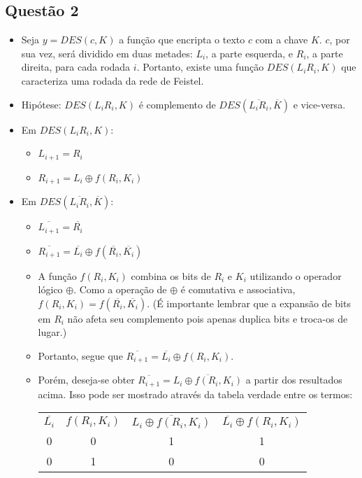 \documentclass{article}
\begin{document}
\subsection*{Questão 2}
\begin{itemize}
    \item Seja $y = DES(c, K)$ a função que encripta o texto $c$ com a chave $K$. $c$, por sua vez, será dividido em duas metades: $L_i$, a parte esquerda, e $R_i$, a parte direita, para cada rodada $i$. Portanto, existe uma função $DES(L_iR_i, K)$ que caracteriza uma rodada da rede de Feistel.
    \item Hipótese: $DES(L_iR_i, K)$ é complemento de $DES(\overline{L_iR_i}, \overline{K})$ e vice-versa.
    \item Em $DES(L_iR_i, K)$:
    \begin{itemize}
        \item $L_{i+1} = R_i$
        \item $R_{i+1} = L_i \oplus f(R_i,K_i)$
    \end{itemize}    
    \item Em $DES(\overline{L_iR_i}, \overline{K})$:
    \begin{itemize}
        \item $\overline{L_{i+1}} = \overline{R_i}$
        \item $\overline{R_{i+1}} = \overline{L_i} \oplus f(\overline{R_i},\overline{K_i})$
        \item A função ${f(R_i,K_i)}$ combina os bits de $R_i$ e $K_i$ utilizando o operador lógico $\oplus$. Como a operação de $\oplus$ é comutativa e associativa, ${f(R_i,K_i)} = f(\overline{R_i},\overline{K_i})$. (É importante lembrar que a expansão de bits em $R_i$ não afeta seu complemento pois apenas duplica bits e troca-os de lugar.)
        \item Portanto, segue que $\overline{R_{i+1}} = \overline{L_i} \oplus f(R_i,K_i)$.
        \item Porém, deseja-se obter $\overline{R_{i+1}} = \overline{{L_i} \oplus f(R_i,K_i)}$ a partir dos resultados acima. Isso pode ser mostrado através da tabela verdade entre os termos:
        \begin{center}
        \begin{tabular}{c|c|c|c}
         $\overline{L_i}$ & ${f(R_i,K_i)}$ & $\overline{{L_i} \oplus f(R_i,K_i)}$& $\overline{L_i} \oplus f(R_i,K_i)$ \\
         0 & 0 & 1 & 1 \\
         0 & 1 & 0 & 0 \\

\end{tabular}
\end{center}
\end{itemize}
\end{itemize}
\end{document}
